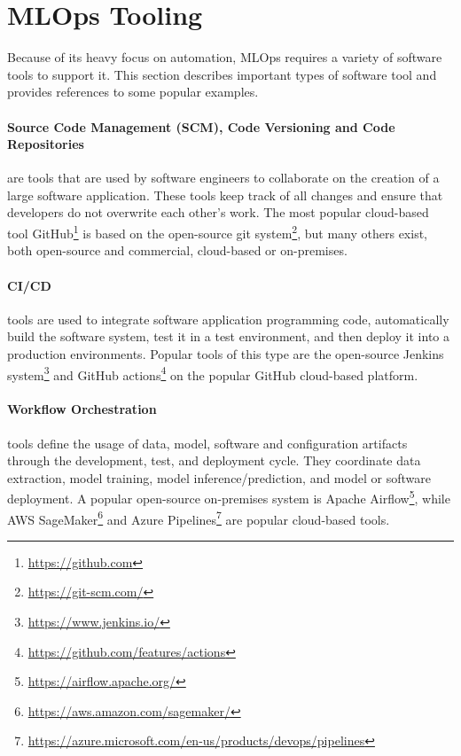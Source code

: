 \section{MLOps Tooling}

Because of its heavy focus on automation, MLOps requires a variety of software tools to support it. This section describes important types of software tool and provides references to some popular examples.

\paragraph*{Source Code Management (SCM), Code Versioning and Code Repositories} are tools that are used by software engineers to collaborate on the creation of a large software application. These tools keep track of all changes and ensure that developers do not overwrite each other's work. The most popular cloud-based tool GitHub\footnote{\url{https://github.com}} is based on the open-source git system\footnote{\url{https://git-scm.com/}}, but many others exist, both open-source and commercial, cloud-based or on-premises. 

\paragraph*{CI/CD} tools are used to integrate software application programming code, automatically build the software system, test it in a test environment, and then deploy it into a production environments. Popular tools of this type are the open-source Jenkins system\footnote{\url{https://www.jenkins.io/}} and GitHub actions\footnote{\url{https://github.com/features/actions}} on the popular GitHub cloud-based platform.

\paragraph*{Workflow Orchestration} tools define the usage of data, model, software and configuration artifacts through the development, test, and deployment cycle. They coordinate data extraction, model training, model inference/prediction, and model or software deployment. A popular open-source on-premises system is Apache Airflow\footnote{\url{https://airflow.apache.org/}}, while AWS SageMaker\footnote{\url{https://aws.amazon.com/sagemaker/}} and Azure Pipelines\footnote{\url{https://azure.microsoft.com/en-us/products/devops/pipelines}} are popular cloud-based tools. 

